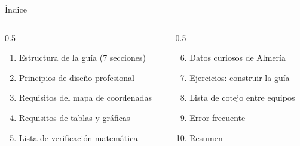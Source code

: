 \documentclass[aspectratio=169, 10pt, spanish]{beamer}
\begin{document}
\begin{frame}[plain]\titlepage\end{frame}

\begin{frame}{Índice}
  \begin{columns}[t]
    \begin{column}{0.5\textwidth}
      \begin{enumerate}
        \item Estructura de la guía (7 secciones)
        \item Principios de diseño profesional
        \item Requisitos del mapa de coordenadas
        \item Requisitos de tablas y gráficas
        \item Lista de verificación matemática
      \end{enumerate}
    \end{column}
    \begin{column}{0.5\textwidth}
      \begin{enumerate}\setcounter{enumi}{5}
        \item Datos curiosos de Almería
        \item Ejercicios: construir la guía
        \item Lista de cotejo entre equipos
        \item Error frecuente
        \item Resumen
      \end{enumerate}
    \end{column}
  \end{columns}
\end{frame}

\end{document}
